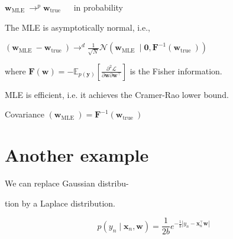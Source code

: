 \documentclass[10pt]{article}
\begin{document}
$\mathbf{w}_{\text {MLE }} \longrightarrow^{p} \mathbf{w}_{\text {true }} \quad$ in probability

The MLE is asymptotically normal, i.e.,

$\left(\mathbf{w}_{\text {MLE }}-\mathbf{w}_{\text {true }}\right) \longrightarrow^{d} \frac{1}{\sqrt{N}} \mathcal{N}\left(\mathbf{w}_{\text {MLE }} \mid \mathbf{0}, \mathbf{F}^{-1}\left(\mathbf{w}_{\text {true }}\right)\right)$

where $\mathbf{F}(\mathbf{w})=-\mathbb{E}_{p(\mathbf{y})}\left[\frac{\partial^{2} \mathcal{L}}{\partial \mathbf{w} \partial \mathbf{w}^{\top}}\right]$ is the Fisher information.

MLE is efficient, i.e. it achieves the Cramer-Rao lower bound.

Covariance $\left(\mathbf{w}_{\text {MLE }}\right)=\mathbf{F}^{-1}\left(\mathbf{w}_{\text {true }}\right)$

\section*{Another example}
We can replace Gaussian distribu-

tion by a Laplace distribution.

$$
p\left(y_{n} \mid \mathbf{x}_{n}, \mathbf{w}\right)=\frac{1}{2 b} e^{-\frac{1}{b}\left|y_{n}-\mathbf{x}_{n}^{\top} \mathbf{w}\right|}
$$
\end{document}

